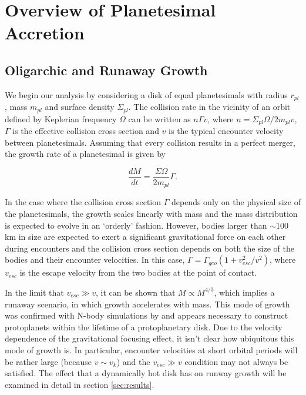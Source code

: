 \documentclass[twocolumn]{aastex63}
\begin{document}
\section{Overview of Planetesimal Accretion}\label{sec:theory}

\subsection{Oligarchic and Runaway Growth}

We begin our analysis by considering a disk of equal planetesimals with radius $r_{pl}$, mass $m_{pl}$ and surface density $\Sigma_{pl}$. The collision rate in the vicinity of an orbit defined by Keplerian frequency $\Omega$ can be written as $n \Gamma v$, where $n = \Sigma_{pl} \Omega / 2 m_{pl} v$, $\Gamma$ is the effective collision cross section and $v$ is the typical encounter velocity between planetesimals. Assuming that every collision results in a perfect merger, the growth rate of a planetesimal is given by

\begin{equation}\label{eq:growth}
	\frac{dM}{dt} = \frac{\Sigma \Omega}{2 m_{pl}} \Gamma.
\end{equation}

In the case where the collision cross section $\Gamma$ depends only on the physical size of the planetesimals, the growth scales linearly with mass and the mass distribution is expected to evolve in an `orderly' fashion. However, bodies larger than $\sim 100$ km in size are expected to exert a significant gravitational force on each other during encounters and the collision cross section depends on both the size of the bodies and their encounter velocities. In this case, $\Gamma = \Gamma_{geo} \left( 1 + v_{esc}^2 / v^2 \right)$, where $v_{esc}$ is the escape velocity from the two bodies at the point of contact.

In the limit that $v_{esc} \gg v$, it can be shown that $M \propto M^{4/3}$, which implies a runaway scenario, in which growth accelerates with mass. This mode of growth was confirmed with N-body simulations by \citet{kokubo96} and appears necessary to construct protoplanets within the lifetime of a protoplanetary disk. Due to the velocity dependence of the gravitational focusing effect, it isn't clear how ubiquitous this mode of growth is. In particular, encounter velocities at short orbital periods will be rather large (because $v \sim v_{k}$) and the $v_{esc} \gg v$ condition may not always be satisfied. The effect that a dynamically hot disk has on runway growth will be examined in detail in section \ref{sec:results}.
\end{document}
